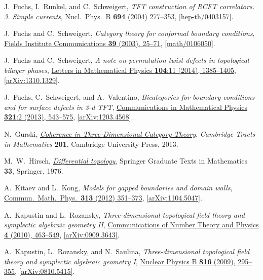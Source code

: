 \documentclass[12pt]{scrartcl}
\newcommand\doi[2]        {\href{http://dx.doi.org/#1}{#2}}
\theoremstyle{definition}
\numberwithin{equation}{section}
\numberwithin{definition}{section}
\numberwithin{figure}{section}
\begin{document}
\begin{thebibliography}{BDSPV}
J.~Fuchs, I.~Runkel, and C.~Schweigert,
\textsl{TFT construction of RCFT correlators. 3. Simple currents}, 
\doi{10.1016/j.nuclphysb.2004.05.014}{Nucl.\ Phys.\ B \textbf{694} (2004) 277--353}, 
\href{http://arxiv.org/abs/hep-th/0403157}{[hep-th/0403157]}.

J.~Fuchs and C.~Schweigert,
\textsl{Category theory for conformal boundary conditions}, 
\doi{10.1090/fic/039/03}{Fields Institute Communications \textbf{39} (2003), 25--71}, 
\href{http://www.arxiv.org/abs/math/0106050}{[math/0106050]}.

J.~Fuchs and C.~Schweigert,
\textsl{A note on permutation twist defects in topological bilayer phases}, 
\doi{10.1007/s11005-014-0719-9}{Letters in Mathematical Physics \textbf{104}:11 (2014), 1385--1405}, 
\href{http://arxiv.org/abs/1310.1329}{[arXiv:1310.1329]}.

J.~Fuchs, C.~Schweigert, and A.~Valentino,
\textsl{Bicategories for boundary conditions and for surface defects in 3-d TFT}, 
\doi{10.1007/s00220-013-1723-0}{Communications in Mathematical Physics \textbf{321}:2 (2013), 543--575}, 
\href{http://arxiv.org/abs/1203.4568}{[arXiv:1203.4568]}.

N.~Gurski, 
\textsl{\doi{10.1017/CBO9781139542333}{Coherence in Three-Dimensional Category Theory}}, 
\textsl{Cambridge Tracts in Mathematics} \textbf{201}, Cambridge University Press, 2013.

M.~W.~Hirsch, 
\textsl{\doi{10.1007/978-1-4684-9449-5}{Differential topology}}, 
Springer Graduate Texts in Mathematics \textbf{33}, Springer, 1976. 

A.~Kitaev and L.~Kong, 
\textsl{Models for gapped boundaries and domain walls},
\doi{10.1007/s00220-012-1500-5}{Commun.\ Math.\ Phys.\ \textbf{313} (2012) 351--373},
\href{http://arxiv.org/abs/1104.5047}{[arXiv:1104.5047]}.

A.~Kapustin and L.~Rozansky, 
\textsl{Three-dimensional topological field theory and symplectic algebraic geometry II}, 
\doi{10.4310/CNTP.2010.v4.n3.a1}{Communications of Number Theory and Physics \textbf{4} (2010), 463--549}, 
\href{http://arxiv.org/abs/0909.3643}{[arXiv:0909.3643]}.

A.~Kapustin, L.~Rozansky, and N.~Saulina, 
\textsl{Three-dimensional topological field theory and symplectic algebraic geometry I}, 
\doi{10.1016/j.nuclphysb.2009.01.027}{Nuclear Physics B \textbf{816} (2009), 295--355}, 
\href{http://arxiv.org/abs/0810.5415}{[arXiv:0810.5415]}.


\end{thebibliography}
\end{document}
